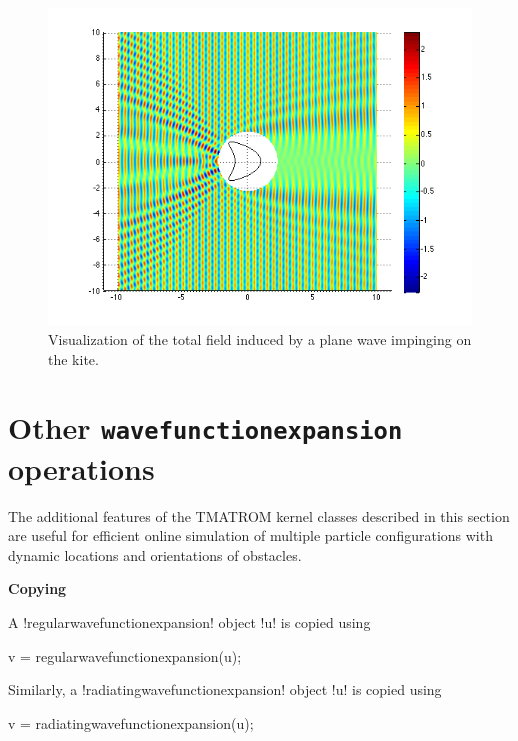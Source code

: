 \documentclass[12pt,letterpaper,final]{article}
\newcommand{\techheading}[1]{%
    \par\vspace{-0.3\parskip}\noindent\hspace{-1cm}\textbf{#1}%
    \par\vspace{-0.5\parskip}\noindent\nopagebreak\ignorespaces}
\begin{document}
\begin{figure}
\centering
\includegraphics[width=12cm]{kite_totalfield}
\caption{\label{fig:kite_totalfield}
Visualization of the total field induced by a plane wave   impinging  on the kite.}
\end{figure}

\section{Other \texttt{wavefunctionexpansion} operations}\label{sec:add_feat}
The additional features of the TMATROM kernel classes described in this section are useful for 
efficient online simulation of multiple particle configurations with dynamic
locations and orientations of obstacles.



\techheading{Copying}
A !regularwavefunctionexpansion! object
!u! is copied using
\begin{matlab}
v = regularwavefunctionexpansion(u);
\end{matlab}
Similarly,
a !radiatingwavefunctionexpansion! object
!u! is copied using
\begin{matlab}
v = radiatingwavefunctionexpansion(u);
\end{matlab}
\end{document}
